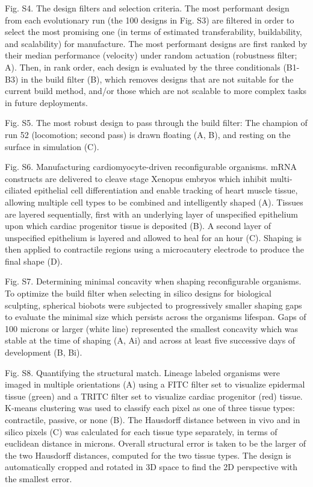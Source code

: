 Fig. S4.  The design filters and selection criteria. The most performant design from each evolutionary run (the 100 designs in Fig. S3) are filtered in order to select the most promising one (in terms of estimated transferability, buildability, and scalability) for manufacture. The most performant designs are first ranked by their median performance (velocity) under random actuation (robustness filter; A). Then, in rank order, each design is evaluated by the three conditionals (B1-B3) in the build filter (B), which removes designs that are not suitable for the current build method, and/or those which are not scalable to more complex tasks in future deployments.


Fig. S5.  The most robust design to pass through the build filter: The champion of run 52 (locomotion; second pass) is drawn floating (A, B), and resting on the surface in simulation (C). 


Fig. S6.  Manufacturing cardiomyocyte-driven reconfigurable organisms. mRNA constructs are delivered to cleave stage Xenopus embryos which inhibit multi-ciliated epithelial cell differentiation and enable tracking of heart muscle tissue, allowing multiple cell types to be combined and intelligently shaped (A). Tissues are layered sequentially, first with an underlying layer of unspecified epithelium upon which cardiac progenitor tissue is deposited (B). A second layer of unspecified epithelium is layered and allowed to heal for an hour (C). Shaping is then applied to contractile regions using a microcautery electrode to produce the final shape (D).



Fig. S7.  Determining minimal concavity when shaping reconfigurable organisms. To optimize the build filter when selecting in silico designs for biological sculpting, spherical biobots were subjected to progressively smaller shaping gaps to evaluate the minimal size which persists across the organisms lifespan. Gaps of 100 microns or larger (white line) represented the smallest concavity which was stable at the time of shaping (A, Ai) and across at least five successive days of development (B, Bi). 


Fig. S8.  Quantifying the structural match. Lineage labeled organisms were imaged in multiple orientations (A) using a FITC filter set to visualize epidermal tissue (green) and a TRITC filter set to visualize cardiac progenitor (red) tissue. K-means clustering was used to classify each pixel as one of three tissue types: contractile, passive, or none (B). The Hausdorff distance between in vivo and in silico pixels (C) was calculated for each tissue type separately, in terms of euclidean distance in microns. Overall structural error is taken to be the larger of the two Hausdorff distances, computed for the two tissue types. The design is automatically cropped and rotated in 3D space to find the 2D perspective with the smallest error.



